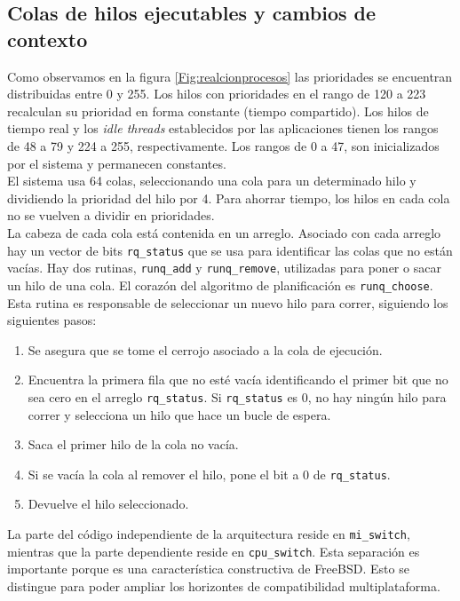 \documentclass[a4paper]{book}
\begin{document}
\subsection{Colas de hilos ejecutables y cambios de contexto}

Como observamos en la figura \ref{Fig:realcionprocesos} las prioridades se encuentran distribuidas entre 0 y 255. Los hilos con prioridades en el rango de 120 a 223 recalculan su prioridad en forma constante (tiempo compartido). Los hilos de tiempo real y los \emph{idle threads} establecidos por las aplicaciones tienen los rangos de 48 a 79 y 224 a 255, respectivamente. Los rangos de 0 a 47, son inicializados por el sistema y permanecen constantes.\\

El sistema usa 64 colas, seleccionando una cola para un determinado hilo y dividiendo la prioridad del hilo por 4. Para ahorrar tiempo, los hilos en cada cola no se vuelven a dividir en prioridades.\\

La cabeza de cada cola está contenida en un arreglo. Asociado con cada arreglo hay un vector de bits \verb|rq_status| que se usa para identificar las colas que no están vacías. Hay dos rutinas, \verb|runq_add| y \verb|runq_remove|, utilizadas para poner o sacar un hilo de una cola. El corazón del algoritmo de planificación es 	\verb|runq_choose|. Esta rutina es responsable de seleccionar un nuevo hilo para correr, siguiendo los siguientes pasos:

\begin{enumerate}
\item Se asegura que se tome el cerrojo asociado a la cola de ejecución.
\item Encuentra la primera fila que no esté vacía identificando el primer bit que no sea cero en el arreglo \verb|rq_status|. Si \verb|rq_status| es 0, no hay ningún hilo para correr y selecciona un hilo que hace un bucle de espera.
\item Saca el primer hilo de la cola no vacía.
\item Si se vac\'ia la cola al remover el hilo, pone el bit a 0 de \verb|rq_status|.
\item Devuelve el hilo seleccionado.
\end{enumerate}

La parte del código independiente de la arquitectura reside en \verb|mi_switch|, mientras que la parte dependiente reside en \verb|cpu_switch|. Esta separaci\'on es importante porque es una caracter\'istica constructiva de FreeBSD. Esto se distingue para poder ampliar los horizontes de compatibilidad multiplataforma.\\
\end{document}
